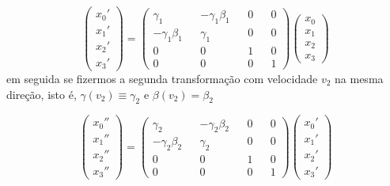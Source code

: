 \documentclass[10pt,a4paper]{article}
\begin{document}
 \begin{equation}\nonumber
	\left(\begin{matrix}
		x_0'\\
		x_1'\\
		x_2'\\
		x_3'
	\end{matrix}\right) = \left(\begin{matrix}
		\gamma_1&&-\gamma_1\beta_1&&0&&0\\
		-\gamma_1\beta_1&&\gamma_1&&0&&0\\
		0&&0&&1&&0\\
		0&&0&&0&&1
	\end{matrix}\right)\left(\begin{matrix}
		x_0\\
		x_1\\
		x_2\\
		x_3
	\end{matrix}\right)
\end{equation}
 em seguida se fizermos a segunda transformação com velocidade $ v_2 $ na mesma direção, isto é, $\gamma(v_2) \equiv \gamma_2$ e $\beta(v_2) = \beta_2$
 
  \begin{equation}\nonumber
 	\left(\begin{matrix}
 		x_0''\\
 		x_1''\\
 		x_2''\\
 		x_3''
 	\end{matrix}\right) = \left(\begin{matrix}
 		\gamma_2&&-\gamma_2\beta_2&&0&&0\\
 		-\gamma_2\beta_2&&\gamma_2&&0&&0\\
 		0&&0&&1&&0\\
 		0&&0&&0&&1
 	\end{matrix}\right)\left(\begin{matrix}
 	x_0'\\
 	x_1'\\
 	x_2'\\
 	x_3'
 \end{matrix}\right)
 \end{equation}
 
\end{document}
